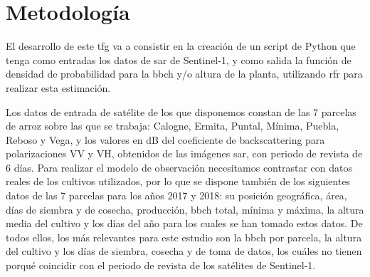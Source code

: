 
\chapter{Metodología}
\label{metodologia}
\par El desarrollo de este \gls{tfg} va a consistir en la creación de un script de Python que tenga como entradas los datos de \gls{sar} de Sentinel-1, y como salida la función de densidad de probabilidad para la \gls{bbch} y/o altura de la planta, utilizando \gls{rfr} para realizar esta estimación. 
\\
\par Los datos de entrada de satélite de los que disponemos constan de las 7 parcelas de arroz sobre las que se trabaja: Calogne, Ermita, Puntal, Mínima, Puebla, Reboso y Vega, y los valores en dB del coeficiente de backscattering para polarizaciones VV y VH, obtenidos de las imágenes \gls{sar}, con periodo de revista de 6 días. Para realizar el modelo de observación necesitamos contrastar con datos reales de los cultivos utilizados, por lo que se dispone también de los siguientes datos de las 7 parcelas para los años 2017 y 2018: su posición geográfica, área, días de siembra y de cosecha, producción, \gls{bbch} total, mínima y máxima, la altura media del cultivo y los días del año para los cuales se han tomado estos datos. De todos ellos, los más relevantes para este estudio son la \gls{bbch} por parcela, la altura del cultivo y los días de siembra, cosecha y de toma de datos, los cuáles no tienen porqué coincidir con el periodo de revista de los satélites de Sentinel-1.
\\
